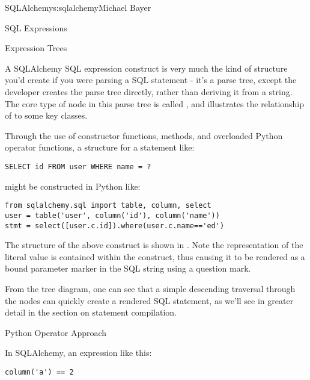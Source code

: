 \begin{aosachapter}{SQLAlchemy}{s:sqlalchemy}{Michael Bayer}
\begin{aosasect1}{SQL Expressions}
\begin{aosasect2}{Expression Trees}

A SQLAlchemy SQL expression construct is very much the kind of structure
you'd create if you were parsing a SQL statement - it's a parse tree,
except the developer creates the parse tree directly, rather than
deriving it from a string.   The core type of node in this parse
tree is called , and  illustrates the relationship
of  to some key classes.


Through the use of constructor functions, methods, and overloaded Python
operator functions, a structure for a statement like:

\begin{verbatim}
SELECT id FROM user WHERE name = ?
\end{verbatim}

might be constructed in Python like:

\begin{verbatim}
from sqlalchemy.sql import table, column, select
user = table('user', column('id'), column('name'))
stmt = select([user.c.id]).where(user.c.name=='ed')
\end{verbatim}

The structure of the above  construct is shown in .
Note the representation of the literal value  is contained
within the  construct, thus causing it to be rendered
as a bound parameter marker in the SQL string using a question mark.


From the tree diagram, one can see that a simple descending traversal through
the nodes can quickly create a rendered SQL statement, as we'll see in greater
detail in the section on statement compilation.

\end{aosasect2}

\begin{aosasect2}{Python Operator Approach}

In SQLAlchemy, an expression like this:

\begin{verbatim}
column('a') == 2
\end{verbatim}


\end{aosasect2}
\end{aosasect1}
\end{aosachapter}
